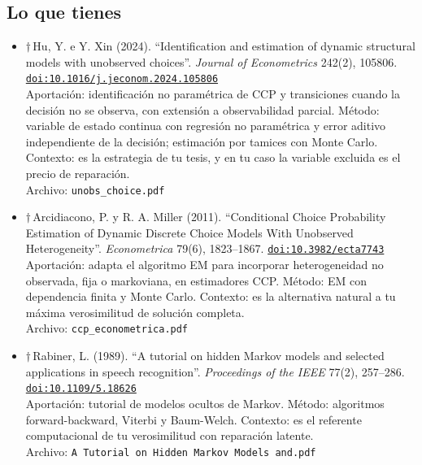 \documentclass[11pt]{article}
\begin{document}
\subsection*{Lo que tienes}
\begin{itemize}
\item $\dagger$\,Hu, Y. e Y. Xin (2024). ``Identification and estimation of dynamic structural models with unobserved choices''. \textit{Journal of Econometrics} 242(2), 105806. \href{https://doi.org/10.1016/j.jeconom.2024.105806}{\texttt{doi:10.1016/j.jeconom.2024.105806}}\\
Aportación: identificación no paramétrica de CCP y transiciones cuando la decisión no se observa, con extensión a observabilidad parcial. Método: variable de estado continua con regresión no paramétrica y error aditivo independiente de la decisión; estimación por tamices con Monte Carlo. Contexto: es la estrategia de tu tesis, y en tu caso la variable excluida es el precio de reparación.\\
{\footnotesize Archivo: \texttt{unobs\_choice.pdf}}
\item $\dagger$\,Arcidiacono, P. y R. A. Miller (2011). ``Conditional Choice Probability Estimation of Dynamic Discrete Choice Models With Unobserved Heterogeneity''. \textit{Econometrica} 79(6), 1823--1867. \href{https://doi.org/10.3982/ecta7743}{\texttt{doi:10.3982/ecta7743}}\\
Aportación: adapta el algoritmo EM para incorporar heterogeneidad no observada, fija o markoviana, en estimadores CCP. Método: EM con dependencia finita y Monte Carlo. Contexto: es la alternativa natural a tu máxima verosimilitud de solución completa.\\
{\footnotesize Archivo: \texttt{ccp\_econometrica.pdf}}
\item $\dagger$\,Rabiner, L. (1989). ``A tutorial on hidden Markov models and selected applications in speech recognition''. \textit{Proceedings of the IEEE} 77(2), 257--286. \href{https://doi.org/10.1109/5.18626}{\texttt{doi:10.1109/5.18626}}\\
Aportación: tutorial de modelos ocultos de Markov. Método: algoritmos forward-backward, Viterbi y Baum-Welch. Contexto: es el referente computacional de tu verosimilitud con reparación latente.\\
{\footnotesize Archivo: \texttt{A Tutorial on Hidden Markov Models and.pdf}}
\end{itemize}
\end{document}
